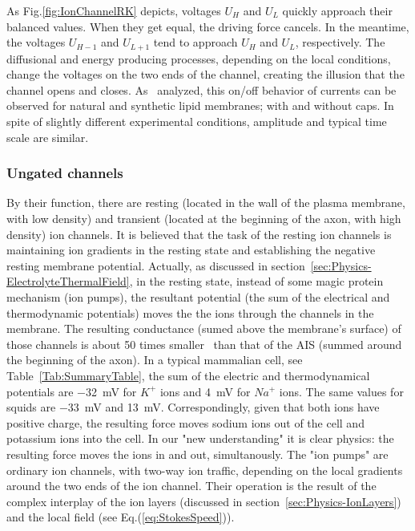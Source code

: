 As Fig.\ref{fig:IonChannelRK} depicts, voltages $U_H$ and $U_L$
quickly approach their balanced values. When they get equal, the driving force cancels.
In the meantime, the voltages $U_{H-1}$ and $U_{L+1}$ tend to approach $U_H$ and $U_L$, respectively.
 The diffusional and energy producing processes, depending on the local conditions, change the voltages
on the two ends of the channel, creating the illusion that the channel opens and closes. As~\cite{HeimburgPhysikOfNerves:2009}
analyzed, this on/off behavior of currents can be observed
for natural and synthetic lipid membranes; with and without caps.
In spite of slightly different experimental conditions, amplitude and typical time scale are similar.




\subsubsection{Ungated channels\label{sec:Physics-UngatedChannels}}


By their function, there are resting (located in the wall of the 
plasma membrane, with low density) and transient (located at the beginning of the axon, with high density) ion channels.
It is believed that the task of the resting ion channels is maintaining ion gradients
in the resting state and establishing the negative resting membrane potential.
Actually, as discussed in section~\ref{sec:Physics-ElectrolyteThermalField}, in the resting state, instead of some magic protein mechanism (ion pumps), the resultant potential
(the sum of the electrical and thermodynamic potentials) moves the
the ions through the channels in the membrane.
The resulting conductance (sumed above the membrane's surface) of those channels
is about 50 times smaller~\cite{ActionPotentialGenerationNatrium:2008,AIS_Updated_Viewpoint:2018} than that of the \gls{AIS} (summed around the beginning of the axon).
In a typical mammalian cell, see Table~\ref{Tab:SummaryTable},
the sum of the electric and thermodynamical potentials are 
\SI{-32}{\milli\volt} %
for $K^+$ ions and \SI{+4}{\milli\volt} %
for $Na^+$ ions.
The same values for squids are 
\SI{-33}{\milli\volt} 
and \SI{+13}{\milli\volt}.
Correspondingly, given that both ions have positive charge, the resulting force moves sodium ions out of the cell and potassium ions into the cell.
In our "new understanding"
it is clear physics: the resulting force moves the ions in and out,
simultanously.
The "ion pumps" are ordinary ion channels, with two-way ion traffic,
depending on the local gradients around the two ends of the 
ion channel. Their operation is the result of the complex interplay
of the ion layers (discussed in section~\ref{sec:Physics-IonLayers})
and the local field (see Eq.(\ref{eq:StokesSpeed})).


